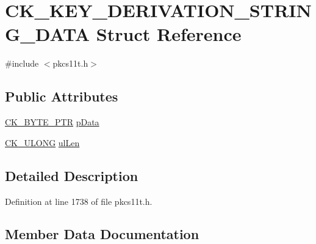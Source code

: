 \hypertarget{struct_c_k___k_e_y___d_e_r_i_v_a_t_i_o_n___s_t_r_i_n_g___d_a_t_a}{}\section{C\+K\+\_\+\+K\+E\+Y\+\_\+\+D\+E\+R\+I\+V\+A\+T\+I\+O\+N\+\_\+\+S\+T\+R\+I\+N\+G\+\_\+\+D\+A\+TA Struct Reference}
\label{struct_c_k___k_e_y___d_e_r_i_v_a_t_i_o_n___s_t_r_i_n_g___d_a_t_a}


{\ttfamily \#include $<$pkcs11t.\+h$>$}

\subsection*{Public Attributes}
\begin{DoxyCompactItemize}
\item 
\hyperlink{pkcs11t_8h_a3d7233a4077fbaf7ae76b64da0a62a21}{C\+K\+\_\+\+B\+Y\+T\+E\+\_\+\+P\+TR} \hyperlink{struct_c_k___k_e_y___d_e_r_i_v_a_t_i_o_n___s_t_r_i_n_g___d_a_t_a_aec743fb0867bb539ae70ab008e17c27b}{p\+Data}
\item 
\hyperlink{pkcs11t_8h_a35181858a3b7a0a81f49d180d8f446ef}{C\+K\+\_\+\+U\+L\+O\+NG} \hyperlink{struct_c_k___k_e_y___d_e_r_i_v_a_t_i_o_n___s_t_r_i_n_g___d_a_t_a_a11068ec8d8e05a164dd2bb2bbeddf924}{ul\+Len}
\end{DoxyCompactItemize}


\subsection{Detailed Description}


Definition at line 1738 of file pkcs11t.\+h.



\subsection{Member Data Documentation}
\mbox{\label{struct_c_k___k_e_y___d_e_r_i_v_a_t_i_o_n___s_t_r_i_n_g___d_a_t_a_aec743fb0867bb539ae70ab008e17c27b}} 
